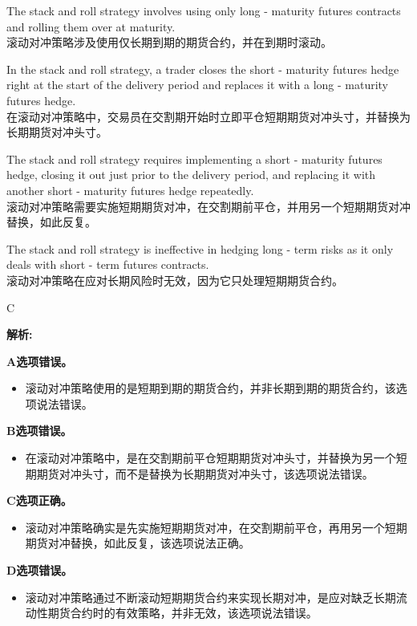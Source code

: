 \documentclass{article}
\newenvironment{explanation}
{\textbf{解析:}\par}
{\par}
\begin{document}
    \begin{choices}
        \item The stack and roll strategy involves using only long - maturity futures contracts and rolling them over at maturity.\\
        滚动对冲策略涉及使用仅长期到期的期货合约，并在到期时滚动。
        \item In the stack and roll strategy, a trader closes the short - maturity futures hedge right at the start of the delivery period and replaces it with a long - maturity futures hedge.\\
        在滚动对冲策略中，交易员在交割期开始时立即平仓短期期货对冲头寸，并替换为长期期货对冲头寸。
        \item The stack and roll strategy requires implementing a short - maturity futures hedge, closing it out just prior to the delivery period, and replacing it with another short - maturity futures hedge repeatedly.\\
        滚动对冲策略需要实施短期期货对冲，在交割期前平仓，并用另一个短期期货对冲替换，如此反复。
        \item The stack and roll strategy is ineffective in hedging long - term risks as it only deals with short - term futures contracts.\\
        滚动对冲策略在应对长期风险时无效，因为它只处理短期期货合约。
    \end{choices}
    
    \begin{correctanswer}
    C
    \end{correctanswer}
    
    \begin{explanation}
    \textbf{A选项错误。}
    \begin{itemize}
    \item 滚动对冲策略使用的是短期到期的期货合约，并非长期到期的期货合约，该选项说法错误。
    \end{itemize}
    \textbf{B选项错误。}
    \begin{itemize}
    \item 在滚动对冲策略中，是在交割期前平仓短期期货对冲头寸，并替换为另一个短期期货对冲头寸，而不是替换为长期期货对冲头寸，该选项说法错误。
    \end{itemize}
    \textbf{C选项正确。}
    \begin{itemize}
    \item 滚动对冲策略确实是先实施短期期货对冲，在交割期前平仓，再用另一个短期期货对冲替换，如此反复，该选项说法正确。
    \end{itemize}
    \textbf{D选项错误。}
    \begin{itemize}
    \item 滚动对冲策略通过不断滚动短期期货合约来实现长期对冲，是应对缺乏长期流动性期货合约时的有效策略，并非无效，该选项说法错误。
    \end{itemize}
    \end{explanation}
    
\end{document}
